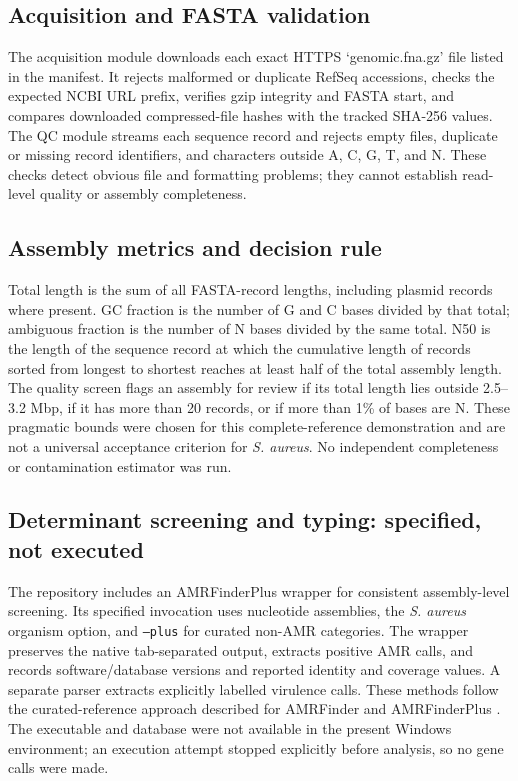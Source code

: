 \documentclass[11pt,a4paper]{article}
\begin{document}
\subsection{Acquisition and FASTA validation}
The acquisition module downloads each exact HTTPS `genomic.fna.gz' file listed in the manifest. It rejects malformed or duplicate RefSeq accessions, checks the expected NCBI URL prefix, verifies gzip integrity and FASTA start, and compares downloaded compressed-file hashes with the tracked SHA-256 values. The QC module streams each sequence record and rejects empty files, duplicate or missing record identifiers, and characters outside A, C, G, T, and N. These checks detect obvious file and formatting problems; they cannot establish read-level quality or assembly completeness.

\subsection{Assembly metrics and decision rule}
Total length is the sum of all FASTA-record lengths, including plasmid records where present. GC fraction is the number of G and C bases divided by that total; ambiguous fraction is the number of N bases divided by the same total. N50 is the length of the sequence record at which the cumulative length of records sorted from longest to shortest reaches at least half of the total assembly length. The quality screen flags an assembly for review if its total length lies outside 2.5--3.2 Mbp, if it has more than 20 records, or if more than 1\% of bases are N. These pragmatic bounds were chosen for this complete-reference demonstration and are not a universal acceptance criterion for \textit{S. aureus}. No independent completeness or contamination estimator was run.

\subsection{Determinant screening and typing: specified, not executed}
The repository includes an AMRFinderPlus wrapper for consistent assembly-level screening. Its specified invocation uses nucleotide assemblies, the \textit{S. aureus} organism option, and \texttt{--plus} for curated non-AMR categories. The wrapper preserves the native tab-separated output, extracts positive AMR calls, and records software/database versions and reported identity and coverage values. A separate parser extracts explicitly labelled virulence calls. These methods follow the curated-reference approach described for AMRFinder and AMRFinderPlus \cite{Feldgarden2019,Feldgarden2021,NCBI_AMRFinderPlus}. The executable and database were not available in the present Windows environment; an execution attempt stopped explicitly before analysis, so no gene calls were made.
\end{document}
